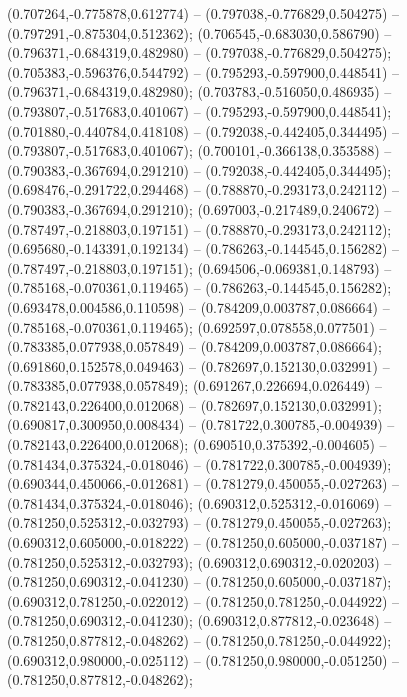  (0.707264,-0.775878,0.612774) -- (0.797038,-0.776829,0.504275) -- (0.797291,-0.875304,0.512362);
 (0.706545,-0.683030,0.586790) -- (0.796371,-0.684319,0.482980) -- (0.797038,-0.776829,0.504275);
 (0.705383,-0.596376,0.544792) -- (0.795293,-0.597900,0.448541) -- (0.796371,-0.684319,0.482980);
 (0.703783,-0.516050,0.486935) -- (0.793807,-0.517683,0.401067) -- (0.795293,-0.597900,0.448541);
 (0.701880,-0.440784,0.418108) -- (0.792038,-0.442405,0.344495) -- (0.793807,-0.517683,0.401067);
 (0.700101,-0.366138,0.353588) -- (0.790383,-0.367694,0.291210) -- (0.792038,-0.442405,0.344495);
 (0.698476,-0.291722,0.294468) -- (0.788870,-0.293173,0.242112) -- (0.790383,-0.367694,0.291210);
 (0.697003,-0.217489,0.240672) -- (0.787497,-0.218803,0.197151) -- (0.788870,-0.293173,0.242112);
 (0.695680,-0.143391,0.192134) -- (0.786263,-0.144545,0.156282) -- (0.787497,-0.218803,0.197151);
 (0.694506,-0.069381,0.148793) -- (0.785168,-0.070361,0.119465) -- (0.786263,-0.144545,0.156282);
 (0.693478,0.004586,0.110598) -- (0.784209,0.003787,0.086664) -- (0.785168,-0.070361,0.119465);
 (0.692597,0.078558,0.077501) -- (0.783385,0.077938,0.057849) -- (0.784209,0.003787,0.086664);
 (0.691860,0.152578,0.049463) -- (0.782697,0.152130,0.032991) -- (0.783385,0.077938,0.057849);
 (0.691267,0.226694,0.026449) -- (0.782143,0.226400,0.012068) -- (0.782697,0.152130,0.032991);
 (0.690817,0.300950,0.008434) -- (0.781722,0.300785,-0.004939) -- (0.782143,0.226400,0.012068);
 (0.690510,0.375392,-0.004605) -- (0.781434,0.375324,-0.018046) -- (0.781722,0.300785,-0.004939);
 (0.690344,0.450066,-0.012681) -- (0.781279,0.450055,-0.027263) -- (0.781434,0.375324,-0.018046);
 (0.690312,0.525312,-0.016069) -- (0.781250,0.525312,-0.032793) -- (0.781279,0.450055,-0.027263);
 (0.690312,0.605000,-0.018222) -- (0.781250,0.605000,-0.037187) -- (0.781250,0.525312,-0.032793);
 (0.690312,0.690312,-0.020203) -- (0.781250,0.690312,-0.041230) -- (0.781250,0.605000,-0.037187);
 (0.690312,0.781250,-0.022012) -- (0.781250,0.781250,-0.044922) -- (0.781250,0.690312,-0.041230);
 (0.690312,0.877812,-0.023648) -- (0.781250,0.877812,-0.048262) -- (0.781250,0.781250,-0.044922);
 (0.690312,0.980000,-0.025112) -- (0.781250,0.980000,-0.051250) -- (0.781250,0.877812,-0.048262);
